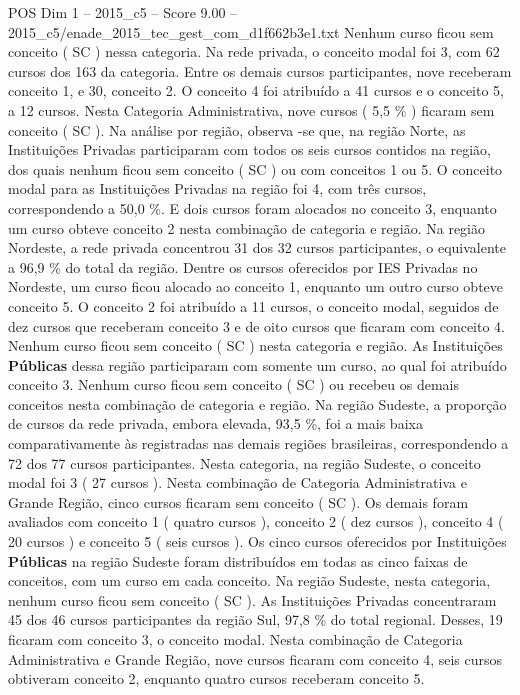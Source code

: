 \begin{textsample}{POS Dim 1 – 2015\_c5 – Score 9.00 – 2015\_c5/enade\_2015\_tec\_gest\_com\_d1f662b3e1.txt}
Nenhum curso ficou sem conceito ( SC ) nessa categoria.
Na rede privada, o conceito modal foi 3, com 62 cursos dos 163 da categoria.
Entre os demais cursos participantes, nove receberam conceito 1, e 30, conceito 2.
O conceito 4 foi atribuído a 41 cursos e o conceito 5, a 12 cursos.
Nesta Categoria Administrativa, nove cursos ( 5,5 \% ) ficaram sem conceito ( SC ).
Na análise por região, observa -se que, na região Norte, as Instituições Privadas participaram com todos os seis cursos contidos na região, dos quais nenhum ficou sem conceito ( SC ) ou com conceitos 1 ou 5.
O conceito modal para as Instituições Privadas na região foi 4, com três cursos, correspondendo a 50,0 \%.
E dois cursos foram alocados no conceito 3, enquanto um curso obteve conceito 2 nesta combinação de categoria e região.
Na região Nordeste, a rede privada concentrou 31 dos 32 cursos participantes, o equivalente a 96,9 \% do total da região.
Dentre os cursos oferecidos por IES Privadas no Nordeste, um curso ficou alocado ao conceito 1, enquanto um outro curso obteve conceito 5.
O conceito 2 foi atribuído a 11 cursos, o conceito modal, seguidos de dez cursos que receberam conceito 3 e de oito cursos que ficaram com conceito 4.
Nenhum curso ficou sem conceito ( SC ) nesta categoria e região.
As Instituições \textbf{Públicas} dessa região participaram com somente um curso, ao qual foi atribuído conceito 3.
Nenhum curso ficou sem conceito ( SC ) ou recebeu os demais conceitos nesta combinação de categoria e região.
Na região Sudeste, a proporção de cursos da rede privada, embora elevada, 93,5 \%, foi a mais baixa comparativamente às registradas nas demais regiões brasileiras, correspondendo a 72 dos 77 cursos participantes.
Nesta categoria, na região Sudeste, o conceito modal foi 3 ( 27 cursos ).
Nesta combinação de Categoria Administrativa e Grande Região, cinco cursos ficaram sem conceito ( SC ).
Os demais foram avaliados com conceito 1 ( quatro cursos ), conceito 2 ( dez cursos ), conceito 4 ( 20 cursos ) e conceito 5 ( seis cursos ).
Os cinco cursos oferecidos por Instituições \textbf{Públicas} na região Sudeste foram distribuídos em todas as cinco faixas de conceitos, com um curso em cada conceito.
Na região Sudeste, nesta categoria, nenhum curso ficou sem conceito ( SC ).
As Instituições Privadas concentraram 45 dos 46 cursos participantes da região Sul, 97,8 \% do total regional.
Desses, 19 ficaram com conceito 3, o conceito modal.
Nesta combinação de Categoria Administrativa e Grande Região, nove cursos ficaram com conceito 4, seis cursos obtiveram conceito 2, enquanto quatro cursos receberam conceito 5.

\end{textsample}
